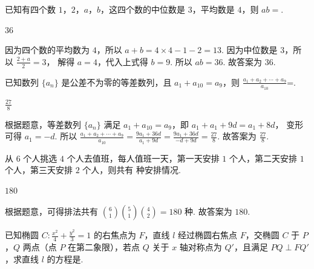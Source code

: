 \begin{problem}
已知有四个数 \(1\)，\(2\)，\(a\)，\(b\)，这四个数的中位数是 \(3\)，平均数是 \(4\)，则 \(ab=\)\fillinblank{}.
\end{problem}

\begin{answer}
\(36\)
\end{answer}

\begin{solution}
因为四个数的平均数为 \(4\)，所以
\(a+b=4\times4-1-2=13\).
因为中位数是 \(3\)，所以
\(\frac{2+a}{2}=3\)，
解得 \(a=4\)，代入上式得 \(b=9\).
所以
\(ab=36\).
故答案为 \(36\).
\end{solution}

\begin{problem}
已知数列 \(\{a_n\}\) 是公差不为零的等差数列，且 \(a_1+a_{10}=a_9\)，则
\(\frac{a_1+a_2+\cdots+a_9}{a_{10}}\)=\fillinblank{}.
\end{problem}

\begin{answer}
\(\frac{27}{8}\)
\end{answer}

\begin{solution}
根据题意，等差数列 \(\{a_n\}\) 满足 \(a_1+a_{10}=a_9\)，即
\(a_1+a_1+9d=a_1+8d\)，
变形可得
\(a_1=-d\).
所以
\(\frac{a_1+a_2+\cdots+a_9}{a_{10}} =\frac{9a_1+36d}{a_1+9d} =\frac{9a_1+36d}{-d+9d} =\frac{27}{8}\).
故答案为 \(\frac{27}{8}\).
\end{solution}

\begin{problem}
从 \(6\) 个人挑选 \(4\) 个人去值班，每人值班一天，第一天安排 \(1\) 个人，第二天安排 \(1\) 个人，第三天安排 \(2\) 个人，则共有\fillinblank{} 种安排情况.
\end{problem}

\begin{answer}
\(180\)
\end{answer}

\begin{solution}
根据题意，可得排法共有
\(\binom{6}{1}\binom{5}{1}\binom{4}{2}=180\)
种.
故答案为 \(180\).
\end{solution}

\begin{problem}
已知椭圆 \(C:\frac{x^2}{4}+\frac{y^2}{3}=1\) 的右焦点为 \(F\)，直线 \(l\) 经过椭圆右焦点 \(F\)，交椭圆 \(C\) 于 \(P\)，\(Q\) 两点（点 \(P\) 在第二象限），若点 \(Q\) 关于 \(x\) 轴对称点为 \(Q'\)，且满足 \(PQ\perp FQ'\)，求直线 \(l\) 的方程是\fillinblank{}.

\end{problem}

